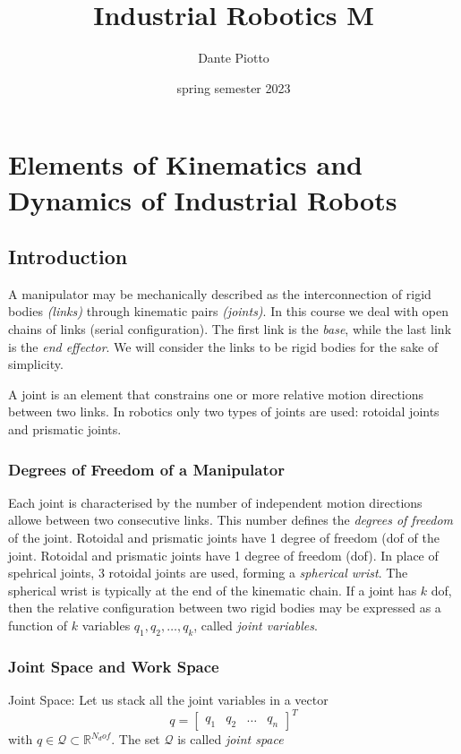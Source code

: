 \documentclass{book}
\title{Industrial Robotics M}
\author{Dante Piotto}
\date{spring semester 2023}
\begin{document}
\maketitle

\chapter{Elements of Kinematics and Dynamics of Industrial Robots}

\section{Introduction}
A manipulator may be mechanically described as the interconnection of rigid bodies \emph{(links)} through kinematic pairs \emph{(joints)}. In this course we deal with open chains of links (serial configuration). The first link is the \emph{base}, while the last link is the \emph{end effector}. We will consider the links to be rigid bodies for the sake of simplicity.

A joint is an element that constrains one or more relative motion directions between two links.
In robotics only two types of joints are used: rotoidal joints and prismatic joints.
\subsection{Degrees of Freedom of a Manipulator}
Each joint is characterised by the number of independent motion directions allowe between two consecutive links. This number defines the \emph{degrees of freedom} of the joint. Rotoidal and prismatic joints have 1 degree of freedom (dof of the joint. Rotoidal and prismatic joints have 1 degree of freedom (dof).
In place of spehrical joints, 3 rotoidal joints are used, forming a \emph{spherical wrist}. The spherical wrist is typically at the end of the kinematic chain.
If a joint has $k$ dof, then the relative configuration between two rigid bodies may be expressed as a function of $k$ variables $q_1, q_2, \dots, q_k$, called \emph{joint variables}.




\subsection{Joint Space and Work Space}
Joint Space: Let us stack all the joint variables in a vector \[q= \begin{bmatrix}
    q_1 & q_2 & \dots & q_n
\end{bmatrix}^T\] with $q\in \mathcal{Q}\subset \mathbb{R}^{N_dof}$. The set $\mathcal{Q}$ is called \emph{joint space}
\end{document}
